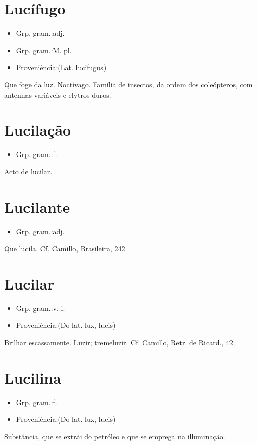 \section{Lucífugo}
\begin{itemize}
\item {Grp. gram.:adj.}
\end{itemize}
\begin{itemize}
\item {Grp. gram.:M. pl.}
\end{itemize}
\begin{itemize}
\item {Proveniência:(Lat. \textunderscore lucifugus\textunderscore )}
\end{itemize}
Que foge da luz.
Noctívago.
Família de insectos, da ordem dos coleópteros, com antennas variáveis e elytros duros.
\section{Lucilação}
\begin{itemize}
\item {Grp. gram.:f.}
\end{itemize}
Acto de lucilar.
\section{Lucilante}
\begin{itemize}
\item {Grp. gram.:adj.}
\end{itemize}
Que lucila. Cf. Camillo, \textunderscore Brasileira\textunderscore , 242.
\section{Lucilar}
\begin{itemize}
\item {Grp. gram.:v. i.}
\end{itemize}
\begin{itemize}
\item {Proveniência:(Do lat. \textunderscore lux\textunderscore , \textunderscore lucis\textunderscore )}
\end{itemize}
Brilhar escassamente.
Luzir; tremeluzir. Cf. Camillo, \textunderscore Retr. de Ricard.\textunderscore , 42.
\section{Lucilina}
\begin{itemize}
\item {Grp. gram.:f.}
\end{itemize}
\begin{itemize}
\item {Proveniência:(Do lat. \textunderscore lux\textunderscore , \textunderscore lucis\textunderscore )}
\end{itemize}
Substância, que se extrái do petróleo e que se emprega na illuminação.
